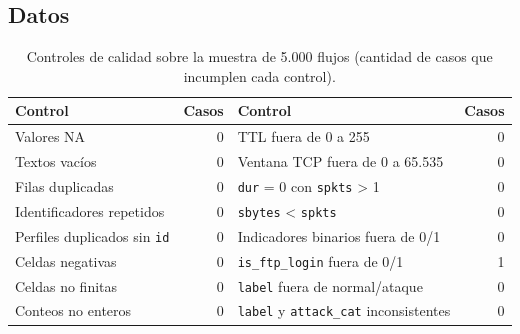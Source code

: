 \subsection{Datos}
\label{anexo:datos}

\begin{table}[htbp]
  \centering
  \caption[Controles de calidad de la muestra]{Controles de calidad sobre la muestra de 5.000 flujos (cantidad de casos que incumplen cada control).}\label{tab:a-calidad}
  \begin{tablacompacta}
  \begin{tabular}{@{}lr@{\hspace{0.8cm}}lr@{}}
  \toprule
  Control & Casos & Control & Casos \\
  \midrule
  Valores NA & 0 & TTL fuera de 0 a 255 & 0 \\
  Textos vacíos & 0 & Ventana TCP fuera de 0 a 65.535 & 0 \\
  Filas duplicadas & 0 & \texttt{dur} = 0 con \texttt{spkts} > 1 & 0 \\
  Identificadores repetidos & 0 & \texttt{sbytes} < \texttt{spkts} & 0 \\
  Perfiles duplicados sin \texttt{id} & 0 & Indicadores binarios fuera de 0/1 & 0 \\
  Celdas negativas & 0 & \texttt{is\_ftp\_login} fuera de 0/1 & 1 \\
  Celdas no finitas & 0 & \texttt{label} fuera de normal/ataque & 0 \\
  Conteos no enteros & 0 & \texttt{label} y \texttt{attack\_cat} inconsistentes & 0 \\
  \bottomrule
  \end{tabular}
  \end{tablacompacta}
\end{table}

